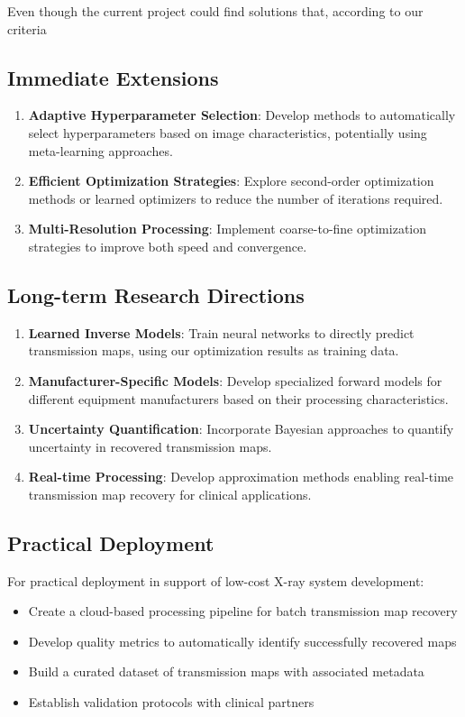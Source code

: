 \documentclass[nomenclature, english, bibtex]{kththesis}
\numberwithin{listing}{chapter}
\begin{document}
Even though the current project could find solutions that, according to our criteria

\subsection{Immediate Extensions}
\begin{enumerate}
    \item \textbf{Adaptive Hyperparameter Selection}: Develop methods to automatically select hyperparameters based on image characteristics, potentially using meta-learning approaches.

    \item \textbf{Efficient Optimization Strategies}: Explore second-order optimization methods or learned optimizers to reduce the number of iterations required.

    \item \textbf{Multi-Resolution Processing}: Implement coarse-to-fine optimization strategies to improve both speed and convergence.
\end{enumerate}

\subsection{Long-term Research Directions}
\begin{enumerate}
    \item \textbf{Learned Inverse Models}: Train neural networks to directly predict transmission maps, using our optimization results as training data.

    \item \textbf{Manufacturer-Specific Models}: Develop specialized forward models for different equipment manufacturers based on their processing characteristics.

    \item \textbf{Uncertainty Quantification}: Incorporate Bayesian approaches to quantify uncertainty in recovered transmission maps.

    \item \textbf{Real-time Processing}: Develop approximation methods enabling real-time transmission map recovery for clinical applications.
\end{enumerate}

\subsection{Practical Deployment}
For practical deployment in support of low-cost X-ray system development:
\begin{itemize}
    \item Create a cloud-based processing pipeline for batch transmission map recovery
    \item Develop quality metrics to automatically identify successfully recovered maps
    \item Build a curated dataset of transmission maps with associated metadata
    \item Establish validation protocols with clinical partners
\end{itemize}
\end{document}
